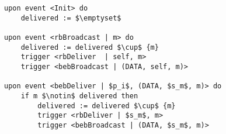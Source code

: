 \begin{lstlisting}[mathescape, caption= Eager reliable broadcast, captionpos=b]
upon event <Init> do
    delivered := $\emptyset$

upon event <rbBroadcast | m> do
    delivered := delivered $\cup$ {m}
    trigger <rbDeliver  | self, m>
    trigger <bebBroadcast | (DATA, self, m)>

upon event <bebDeliver | $p_i$, (DATA, $s_m$, m)> do
    if m $\notin$ delivered then
        delivered := delivered $\cup$ {m}
        trigger <rbDeliver | $s_m$, m>
        trigger <bebBroadcast | (DATA, $s_m$, m)>
\end{lstlisting}
